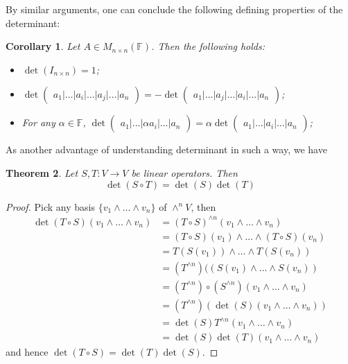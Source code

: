 \documentclass[12pt]{amsbook}
\newtheorem{theorem}{Theorem}[section]
\newtheorem{corollary}[theorem]{Corollary}
\begin{document}
By similar arguments, one can conclude the following defining properties of the determinant:
\begin{corollary}
    Let $A \in M_{n\times n}(\mathbb{F})$. Then the following holds:
\begin{itemize}
    \item $\det(I_{n\times n})= 1$;
    \item $\det\begin{pmatrix} a_1 | \dots  | a_i | \dots | a_j | \dots | a_n \end{pmatrix} = - \det\begin{pmatrix} a_1 | \dots  | a_j | \dots | a_i | \dots | a_n \end{pmatrix}$;
    \item For any $\alpha \in \mathbb{F}$, $\det\begin{pmatrix} a_1 | \dots  | \alpha a_i | \dots | a_n \end{pmatrix} = \alpha \det\begin{pmatrix} a_1 | \dots  | a_i | \dots | a_n \end{pmatrix}$;
\end{itemize}
\end{corollary}

As another advantage of understanding determinant in such a way, we have
\begin{theorem}
    Let $S, T: V \to V$ be linear operators. Then
    $$\det(S \circ T) = \det(S)\det(T)$$
\end{theorem}
\begin{proof}
Pick any basis $\{v_1 \wedge \dots \wedge v_n\}$ of $\wedge^n V$, then
\begin{align*}
\det(T \circ S)(v_1 \wedge \dots \wedge v_n) &= (T \circ S)^{\wedge n}(v_1 \wedge \dots \wedge v_n) \\
&= (T \circ S)(v_1) \wedge \dots \wedge (T \circ S)(v_n) \\
&= T(S(v_1)) \wedge \dots \wedge T(S(v_n)) \\
&= (T^{\wedge n}) ((S(v_1) \wedge \dots \wedge S(v_n))\\
&= (T^{\wedge n}) \circ (S^{\wedge n}) (v_1 \wedge \dots \wedge v_n)\\
&= (T^{\wedge n})(\det(S)(v_1 \wedge \dots \wedge v_n))\\
&= \det(S)T^{\wedge n}(v_1 \wedge \dots \wedge v_n)\\
&= \det(S)\det(T)(v_1 \wedge \dots \wedge v_n)
\end{align*}
and hence $\det(T \circ S) = \det(T)\det(S)$.
\end{proof}
\end{document}
